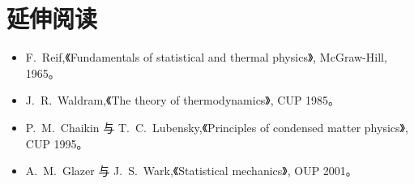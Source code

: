\section*{延伸阅读}

\begin{itemize}[itemsep=0.2em]
\item F.~Reif,《Fundamentals of statistical and thermal physics》, McGraw-Hill,
1965。
\item J.~R.~Waldram,《The theory of thermodynamics》, CUP 1985。
\item P.~M.~Chaikin 与 T.~C.~Lubensky,《Principles of condensed matter physics》,
CUP 1995。
\item A.~M.~Glazer 与 J.~S.~Wark,《Statistical mechanics》, OUP 2001。
\end{itemize}
